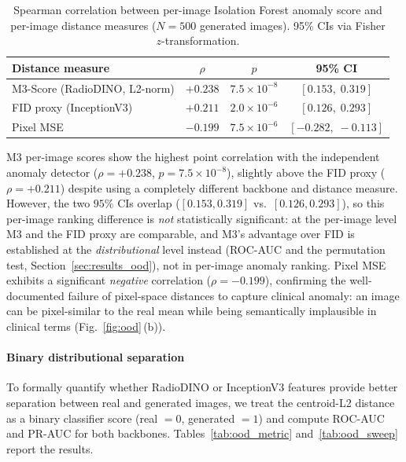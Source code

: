 \documentclass[lettersize,journal]{IEEEtran}
\begin{document}
\begin{table}[t]
\centering
\caption{%
  Spearman correlation between per-image Isolation Forest anomaly score
  and per-image distance measures ($N = 500$ generated images).
  95\% CIs via Fisher $z$-transformation.
}
\label{tab:ood_spearman}
\begin{tabular}{lccc}
\toprule
Distance measure & $\rho$ & $p$ & 95\% CI \\
\midrule
M3-Score (RadioDINO, L2-norm) & $\mathbf{+0.238}$ & $7.5 \times 10^{-8}$ & $[0.153,\;0.319]$ \\
FID proxy (InceptionV3)     & $+0.211$          & $2.0 \times 10^{-6}$ & $[0.126,\;0.293]$ \\
Pixel MSE                   & $-0.199$          & $7.5 \times 10^{-6}$ & $[-0.282,\;-0.113]$ \\
\bottomrule
\end{tabular}
\end{table}

M3 per-image scores show the highest point correlation with the independent
anomaly detector ($\rho = +0.238$, $p = 7.5 \times 10^{-8}$), slightly above
the FID proxy ($\rho = +0.211$) despite using a completely different backbone
and distance measure. However, the two $95\%$ CIs overlap
($[0.153,0.319]$ vs.\ $[0.126,0.293]$), so this per-image ranking difference is
\emph{not} statistically significant: at the per-image level M3 and the FID
proxy are comparable, and M3's advantage over FID is established at the
\emph{distributional} level instead (ROC-AUC and the permutation test,
Section~\ref{sec:results_ood}), not in per-image anomaly ranking.
Pixel MSE exhibits a significant \emph{negative} correlation
($\rho = -0.199$), confirming the well-documented failure of pixel-space
distances to capture clinical anomaly: an image can be pixel-similar to
the real mean while being semantically implausible in clinical terms
(Fig.~\ref{fig:ood}\,(b)).

\paragraph{Binary distributional separation}
To formally quantify whether RadioDINO or InceptionV3 features provide
better separation between real and generated images, we treat the
centroid-L2 distance as a binary classifier score (real $= 0$,
generated $= 1$) and compute ROC-AUC and PR-AUC for both backbones.
Tables~\ref{tab:ood_metric} and~\ref{tab:ood_sweep} report the results.
\end{document}
